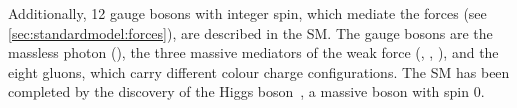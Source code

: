 Additionally, 12 gauge bosons with integer spin, which mediate the
forces (see \cref{sec:standardmodel:forces}), are described in the SM.
The gauge bosons are the massless photon (\g), the three massive mediators of
the weak force (\Wp, \Wm, \Z), and the eight gluons, which carry different
colour charge configurations. The SM has been completed by the discovery of
the Higgs boson~\cite{Higgs-Atlas,Higgs-CMS}, a massive boson with spin 0.

